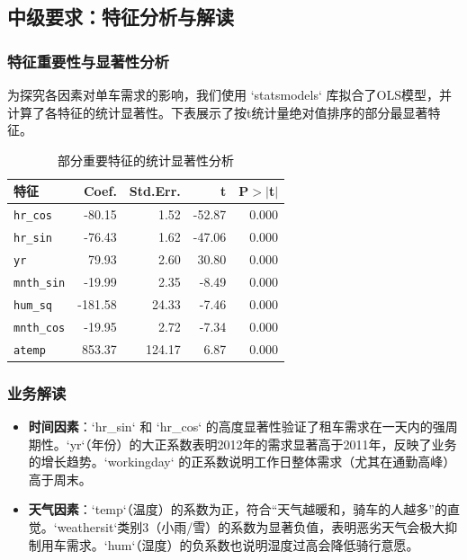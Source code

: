 \documentclass[UTF8,a4paper,10pt]{ctexart}
\begin{document}
\subsection{中级要求：特征分析与解读}
\subsubsection{特征重要性与显著性分析}
为探究各因素对单车需求的影响，我们使用 `statsmodels` 库拟合了OLS模型，并计算了各特征的统计显著性。下表展示了按t统计量绝对值排序的部分最显著特征。

\begin{table}[H]
    \centering
    \caption{部分重要特征的统计显著性分析}
    \begin{tabular}{lrrrr}
        \toprule
        \textbf{特征} & \textbf{Coef.} & \textbf{Std.Err.} & \textbf{t} & \textbf{P$> |$t$|$} \\
        \midrule
        \texttt{hr\_cos} & -80.15 & 1.52 & -52.87 & 0.000 \\
        \texttt{hr\_sin} & -76.43 & 1.62 & -47.06 & 0.000 \\
        \texttt{yr} & 79.93 & 2.60 & 30.80 & 0.000 \\
        \texttt{mnth\_sin} & -19.99 & 2.35 & -8.49 & 0.000 \\
        \texttt{hum\_sq} & -181.58 & 24.33 & -7.46 & 0.000 \\
        \texttt{mnth\_cos} & -19.95 & 2.72 & -7.34 & 0.000 \\
        \texttt{atemp} & 853.37 & 124.17 & 6.87 & 0.000 \\
        \bottomrule
    \end{tabular}
\end{table}

\subsubsection{业务解读}
\begin{itemize}
    \item \textbf{时间因素}：`hr_sin` 和 `hr_cos` 的高度显著性验证了租车需求在一天内的强周期性。`yr`（年份）的大正系数表明2012年的需求显著高于2011年，反映了业务的增长趋势。`workingday` 的正系数说明工作日整体需求（尤其在通勤高峰）高于周末。
    \item \textbf{天气因素}：`temp`（温度）的系数为正，符合“天气越暖和，骑车的人越多”的直觉。`weathersit`类别3（小雨/雪）的系数为显著负值，表明恶劣天气会极大抑制用车需求。`hum`（湿度）的负系数也说明湿度过高会降低骑行意愿。
\end{itemize}
\end{document}
